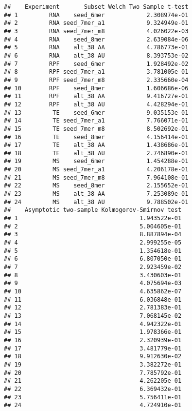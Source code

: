 \documentclass[
]{article}
\begin{document}
\begin{verbatim}
##    Experiment       Subset Welch Two Sample t-test
## 1         RNA    seed_6mer            2.308974e-01
## 2         RNA seed_7mer_a1            9.324949e-01
## 3         RNA seed_7mer_m8            4.026022e-03
## 4         RNA    seed_8mer            2.639084e-06
## 5         RNA    alt_38 AA            4.786773e-01
## 6         RNA    alt_38 AU            8.393753e-02
## 7         RPF    seed_6mer            1.928492e-02
## 8         RPF seed_7mer_a1            3.781005e-01
## 9         RPF seed_7mer_m8            2.335660e-04
## 10        RPF    seed_8mer            1.606686e-06
## 11        RPF    alt_38 AA            9.416727e-01
## 12        RPF    alt_38 AU            4.428294e-01
## 13         TE    seed_6mer            9.035153e-01
## 14         TE seed_7mer_a1            7.766071e-01
## 15         TE seed_7mer_m8            8.502692e-01
## 16         TE    seed_8mer            4.156414e-01
## 17         TE    alt_38 AA            1.438686e-01
## 18         TE    alt_38 AU            2.746890e-01
## 19         MS    seed_6mer            1.454288e-01
## 20         MS seed_7mer_a1            4.206178e-01
## 21         MS seed_7mer_m8            7.964108e-01
## 22         MS    seed_8mer            2.155652e-01
## 23         MS    alt_38 AA            7.253089e-01
## 24         MS    alt_38 AU            9.788502e-01
##    Asymptotic two-sample Kolmogorov-Smirnov test
## 1                                   1.943522e-01
## 2                                   5.004605e-01
## 3                                   8.887894e-04
## 4                                   2.999255e-05
## 5                                   1.354618e-01
## 6                                   6.807050e-01
## 7                                   2.923459e-02
## 8                                   3.430603e-01
## 9                                   4.075694e-03
## 10                                  4.635862e-07
## 11                                  6.036848e-01
## 12                                  2.781383e-01
## 13                                  7.068145e-02
## 14                                  4.942322e-01
## 15                                  1.978366e-01
## 16                                  2.320939e-01
## 17                                  3.481779e-01
## 18                                  9.912630e-02
## 19                                  3.382272e-01
## 20                                  7.785792e-01
## 21                                  4.262205e-01
## 22                                  6.369432e-01
## 23                                  5.756411e-01
## 24                                  4.724910e-01
\end{verbatim}
\end{document}
